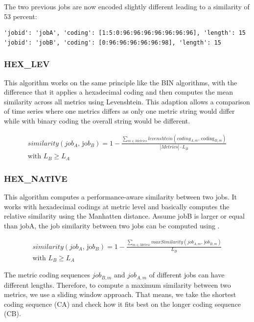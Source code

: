 \documentclass[]{llncs}
\begin{document}
The two previous jobs are now encoded slightly different leading to a similarity of 53 percent:
\begin{lstlisting}
'jobid': 'jobA', 'coding': [1:5:0:96:96:96:96:96:96:96], 'length': 15
'jobid': 'jobB', 'coding': [0:96:96:96:96:96:98], 'length': 15
\end{lstlisting}

\subsubsection{HEX\_LEV}
This algorithm works on the same principle like the BIN algorithms, with the difference that it applies a hexadecimal coding and then computes the mean similarity across all metrics using Levenshtein.
This adaption allows a comparison of time series where one metrics differs as only one metric string would differ while with binary coding the overall string would be different.

\begin{multline}
  similarity \left( job_{A}\text{, jo}b_{B} \right) = 1 -\frac{ \sum_{m \in Metrics}^{} levenshtein \left( coding_{A,m}\text{, coding}_{B,m} \right) }{|Metrics| \cdot L_{B}} \\
	\text{with } L_{B} \geq L_{A}
\end{multline}

\subsubsection{HEX\_NATIVE}
This algorithm computes a performance-aware similarity between two jobs.
It works with hexadecimal codings at metric level and basically computes the relative similarity using the Manhatten distance.
Assume jobB is larger or equal than jobA, the job similarity between two jobs can be computed using .

\begin{multline}
similarity \left( job_{A}\text{, jo}b_{B} \right) = 1-\frac{ \sum _{m \in Metric}^{}maxSimilarity \left( job_{A,m}\text{, jo}b_{B,m} \right) }{L_{B}}\\
\text{with }L_{B} \geq L_{A} \label{eq:hexn}
\end{multline}

The metric coding sequences $job_{B,m}$ and $job_{A,m}$ of different jobs can have different lengths.
Therefore, to compute a maximum similarity between two metrics, we use a sliding window approach.
That means, we take the shortest coding sequence (CA) and check how it fits best on the longer coding sequence (CB).
\end{document}
